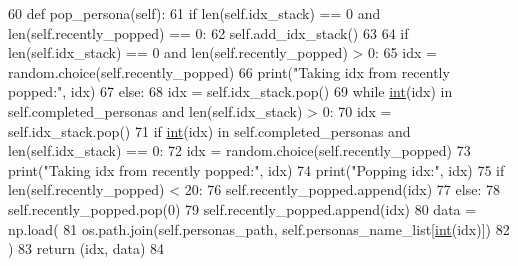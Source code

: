 \begin{DoxyCode}
60     \textcolor{keyword}{def }pop\_persona(self):
61         \textcolor{keywordflow}{if} len(self.idx\_stack) == 0 \textcolor{keywordflow}{and} len(self.recently\_popped) == 0:
62             self.add\_idx\_stack()
63 
64         \textcolor{keywordflow}{if} len(self.idx\_stack) == 0 \textcolor{keywordflow}{and} len(self.recently\_popped) > 0:
65             idx = random.choice(self.recently\_popped)
66             print(\textcolor{stringliteral}{"Taking idx from recently popped:"}, idx)
67         \textcolor{keywordflow}{else}:
68             idx = self.idx\_stack.pop()
69             \textcolor{keywordflow}{while} \hyperlink{namespacelanguage__model_1_1eval__ppl_a7d12ee00479673c5c8d1f6d01faa272a}{int}(idx) \textcolor{keywordflow}{in} self.completed\_personas \textcolor{keywordflow}{and} len(self.idx\_stack) > 0:
70                 idx = self.idx\_stack.pop()
71             \textcolor{keywordflow}{if} \hyperlink{namespacelanguage__model_1_1eval__ppl_a7d12ee00479673c5c8d1f6d01faa272a}{int}(idx) \textcolor{keywordflow}{in} self.completed\_personas \textcolor{keywordflow}{and} len(self.idx\_stack) == 0:
72                 idx = random.choice(self.recently\_popped)
73                 print(\textcolor{stringliteral}{"Taking idx from recently popped:"}, idx)
74             print(\textcolor{stringliteral}{"Popping idx:"}, idx)
75             \textcolor{keywordflow}{if} len(self.recently\_popped) < 20:
76                 self.recently\_popped.append(idx)
77             \textcolor{keywordflow}{else}:
78                 self.recently\_popped.pop(0)
79                 self.recently\_popped.append(idx)
80         data = np.load(
81             os.path.join(self.personas\_path, self.personas\_name\_list[\hyperlink{namespacelanguage__model_1_1eval__ppl_a7d12ee00479673c5c8d1f6d01faa272a}{int}(idx)])
82         )
83         \textcolor{keywordflow}{return} (idx, data)
84 
\end{DoxyCode}
\mbox{\label{classparlai_1_1mturk_1_1tasks_1_1personachat_1_1personachat__rephrase_1_1worlds_1_1PersonasGenerator_a91fac0745cf919d3ac0e8b6db2e2cd2f}} 
